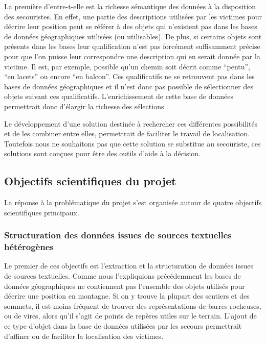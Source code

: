 La première d'entre-t-elle est la richesse sémantique des données à la
disposition des secouristes. En effet, une partie des descriptions
utilisées par les victimes pour décrire leur position peut se référer
à des objets qui n'existent pas dans les bases de données
géographiques utilisées (ou utilisables). De plus, si certains objets
sont présents dans les bases leur qualification n'est pas forcément
suffisamment précise pour que l'on puisse leur correspondre une
description qui en serait donnée par la victime. Il est, par exemple,
possible qu'un chemin soit décrit comme \enquote{pentu}, \enquote{en
  lacets} ou encore \enquote{en balcon}. Ces qualificatifs ne se
retrouvent pas dans les bases de données géographiques et il n'est
donc pas possible de sélectionner des objets suivant ces
qualificatifs. L'enrichissement de cette base de données permettrait
donc d'élargir la richesse des sélections




Le développement d'une solution destinée à rechercher ces
différentes possibilités et de les combiner entre elles, permettrait
de faciliter le travail de localisation. Toutefois nous ne souhaitons
pas que cette solution se substitue au secouriste, ces solutions sont
conçues pour être des outils d'aide à la décision.

\subsection{Objectifs scientifiques du projet}
\label{subsec:1-2-3}

La réponse à la problématique du projet s'est organisée autour de
quatre objectifs scientifiques principaux.

\subsubsection{Structuration des données issues de sources textuelles
  hétérogènes}
\label{subsec:1-2-3-1}

Le premier de ces objectifs est l'extraction et la structuration de
données issues de sources textuelles. Comme nous l’expliquions
précédemment les bases de données géographiques ne contiennent pas
l'ensemble des objets utilisés pour décrire une position en
montagne. Si on y trouve la plupart des sentiers et des sommets, il
est moins fréquent de trouver des représentations de barres rocheuses,
ou de vires, alors qu'il s'agit de points de repères utiles sur le
terrain. L'ajout de ce type d'objet dans la base de données utilisées
par les secours permettrait d’affiner ou de faciliter la localisation
des victimes.

